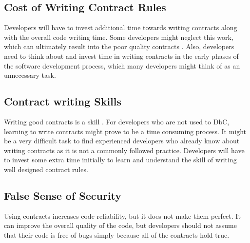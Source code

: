 \subsection{Cost of Writing Contract Rules}
Developers will have to invest additional time towards writing contracts along with the overall code writing time. Some developers might neglect this work, which can ultimately result into the poor quality contracts \cite{ApplyingDesignByContract}.
Also, developers need to think about and invest time in writing contracts in the early phases of the software development process, which many developers might think of as an unnecessary task.

\subsection{Contract writing Skills}
Writing good contracts is a skill \cite{DesignByContractByExample}. For developers who are not used to DbC, learning to write contracts might prove to be a time consuming process. It might be a very difficult task to find experienced developers who already know about writing contracts as it is not a commonly followed practice. Developers will have to invest some extra time initially to learn and understand the skill of writing well designed contract rules.

\subsection{False Sense of Security}
Using contracts increases code reliability, but it does not make them perfect. It can improve the overall quality of the code, but developers should not assume that their code is free of bugs simply because all of the contracts hold true.
